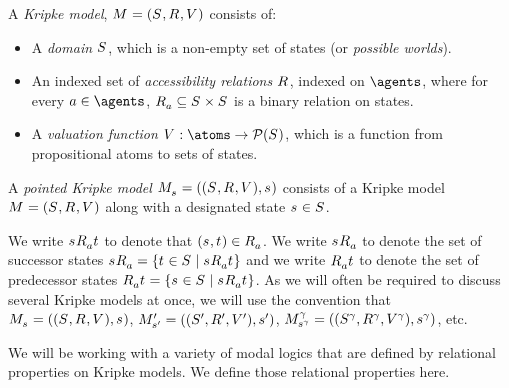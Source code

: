 \begin{definition}
A {\em Kripke model}, $\modelAndTuple$ consists of:
\begin{itemize}
    \item A {\em domain} $\states$, which is a non-empty set of states (or {\em possible worlds}).
    \item An indexed set of {\em accessibility relations} $\accessibilityRel$, indexed on $\agents$, where for every $\agentA \in \agents$, $\accessibility{\agentA} \subseteq \states \times \states$ is a binary relation on states.
    \item A {\em valuation function} $\valuation : \atoms \to \powerset(\states)$, which is a function from propositional atoms to sets of states.
\end{itemize}
A {\em pointed Kripke model} $\pointedModelAndTuple{\stateS}$ consists of a Kripke model $\modelAndTuple$ along with a designated state $\stateS \in \states$.
\end{definition}

We write $\stateS \accessibility{\agentA} \stateT$ to denote that $(\stateS, \stateT) \in \accessibility{\agentA}$.
We write $\successors{\agentA}{\stateS}$ to denote the set of successor states $\successors{\agentA}{\stateS} = \{\stateT \in \states \mid \stateS \accessibility{\agentA} \stateT\}$ and
we write $\predecessors{\agentA}{\stateT}$ to denote the set of predecessor states $\predecessors{\agentA}{\stateT} = \{\stateS \in \states \mid \stateS \accessibility{\agentA} \stateT\}$.
As we will often be required to discuss several Kripke models at once, we will use the convention that $\pointedModelAndTuple{\stateS}$, $\pointedModelAndTuple[\prime]{\stateS[\prime]}$, $\pointedModelAndTuple[\gamma]{\stateS[\gamma]}$, etc.

We will be working with a variety of modal logics that are defined by relational properties on Kripke models.
We define those relational properties here.

